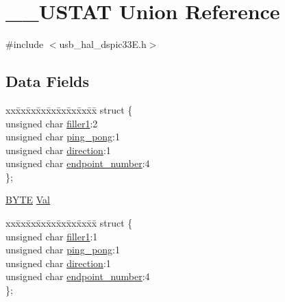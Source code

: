 \hypertarget{union_____u_s_t_a_t}{}\section{\+\_\+\+\_\+\+U\+S\+T\+A\+T Union Reference}
\label{union_____u_s_t_a_t}


{\ttfamily \#include $<$usb\+\_\+hal\+\_\+dspic33\+E.\+h$>$}

\subsection*{Data Fields}
\begin{DoxyCompactItemize}
\item 
\begin{tabbing}
xx\=xx\=xx\=xx\=xx\=xx\=xx\=xx\=xx\=\kill
struct \{\\
\>unsigned char \hyperlink{union_____u_s_t_a_t_a54acb45d462e0ff47705a7514916273d}{filler1}:2\\
\>unsigned char \hyperlink{union_____u_s_t_a_t_a9ec468b66f0444dc9be4ec11f75a0a5f}{ping\_pong}:1\\
\>unsigned char \hyperlink{union_____u_s_t_a_t_a4c9b82152ef06a9d3b78f60779cd4b85}{direction}:1\\
\>unsigned char \hyperlink{union_____u_s_t_a_t_a4f411fec039d172f03e2a41d46ff58ca}{endpoint\_number}:4\\
\}; \\

\end{tabbing}\item 
\hyperlink{_generic_type_defs_8h_a4ae1dab0fb4b072a66584546209e7d58}{B\+Y\+T\+E} \hyperlink{union_____u_s_t_a_t_a5ab8c2bf45b20b5f7aa3a4f083896cec}{Val}
\item 
\begin{tabbing}
xx\=xx\=xx\=xx\=xx\=xx\=xx\=xx\=xx\=\kill
struct \{\\
\>unsigned char \hyperlink{union_____u_s_t_a_t_a54acb45d462e0ff47705a7514916273d}{filler1}:1\\
\>unsigned char \hyperlink{union_____u_s_t_a_t_a9ec468b66f0444dc9be4ec11f75a0a5f}{ping\_pong}:1\\
\>unsigned char \hyperlink{union_____u_s_t_a_t_a4c9b82152ef06a9d3b78f60779cd4b85}{direction}:1\\
\>unsigned char \hyperlink{union_____u_s_t_a_t_a4f411fec039d172f03e2a41d46ff58ca}{endpoint\_number}:4\\
\}; \\


\end{tabbing}
\end{DoxyCompactItemize}
